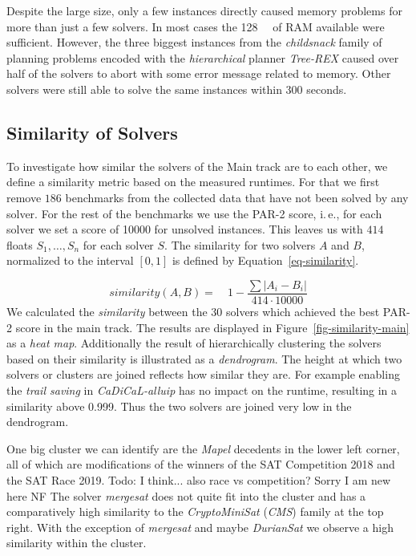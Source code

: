 \documentclass{elsarticle}
\newcommand{\todo}[1]{{\color{purple}Todo: #1}}
\begin{document}
Despite the large size, only a few instances directly caused memory problems for
more than just a few solvers. In most cases the \SI{128}{\giga\byte} of RAM
available were sufficient.
However, the three biggest instances from the \emph{childsnack} family of
planning problems encoded with the \emph{hierarchical} planner \emph{Tree-REX}
caused over half of the solvers to abort with some error message related to
memory. Other solvers were still able to solve the same instances within $300$
seconds.

\subsection{Similarity of Solvers}
To investigate how similar the solvers of the Main track are to each other, we
define a similarity metric based on the measured runtimes. For that we first
remove $186$ benchmarks from the collected data that have not been solved by any
solver. For the rest of the benchmarks we use the PAR-2 score,
i.\,e., for each solver we set a score of \num{10000} for unsolved instances.
This leaves us with $414$ floats
$S_{1},\dots,S_{n}$ for each solver $S$. The similarity for two solvers $A$
and $B$, normalized to the interval $[0,1]$ is defined
by Equation~\ref{eq-similarity}.

\begin{equation}
\label{eq-similarity}
	similarity(A, B) =\quad 1 - \frac{\sum{|A_{i} - B_{i}|}}{414 \cdot 10000}
\end{equation}
We calculated the \emph{similarity} between the $30$ solvers which achieved the
best PAR-2 score in the main track. The results are displayed in
Figure~\ref{fig-similarity-main} as a \emph{heat map}. Additionally the result
of hierarchically clustering the solvers based on their similarity is
illustrated as a \emph{dendrogram}. The height at which two solvers or clusters
are joined reflects how similar they are. For example
enabling the \emph{trail saving} in \emph{CaDiCaL-alluip} has no impact on the
runtime, resulting in a similarity above \num{0.999}. Thus the two solvers are joined very low in the dendrogram.

One big cluster we can identify are the \emph{Mapel} decedents in the lower left
corner, all of which are modifications of the winners of the SAT Competition
2018 and the SAT Race 2019. \todo{I think... also race vs competition? Sorry I am new
  here NF} The solver \emph{mergesat} does not quite fit into the cluster and
has a comparatively high similarity to the \emph{CryptoMiniSat} (\emph{CMS})
family at the top right. With the exception of \emph{mergesat} and maybe
\emph{DurianSat} we observe a high similarity within the cluster.
\end{document}
